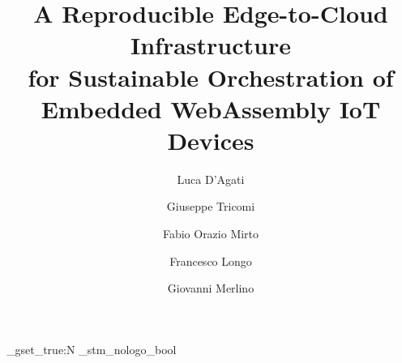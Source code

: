 \documentclass[a4paper,fleqn]{cas-dc}
\begin{document}
\let\WriteBookmarks\relax
\def\floatpagepagefraction{1}
\def\textpagefraction{.001}


\title[mode=title]{\texorpdfstring{A Reproducible Edge-to-Cloud Infrastructure\\ for Sustainable Orchestration of Embedded WebAssembly IoT Devices}{A Reproducible Edge-to-Cloud Infrastructure for Sustainable Orchestration of Embedded WebAssembly IoT Devices}}

\author[unime, cini]{Luca D'Agati}\cormark[1]

\author[unime, cini]{Giuseppe Tricomi}
\author[unime]{Fabio Orazio Mirto}
\author[unime,cini]{Francesco Longo}
\author[unime,cini]{Giovanni Merlino}
\address[unime]{Department of Engineering, University of Messina, Messina, Italy}
\address[cini]{CINI\@: National Interuniversity Consortium for Informatics, Rome, Italy}





\ExplSyntaxOn%
\bool_gset_true:N \g_stm_nologo_bool
\ExplSyntaxOff%
\begin{NoHyper}
\maketitle
\end{NoHyper}














\end{document}
